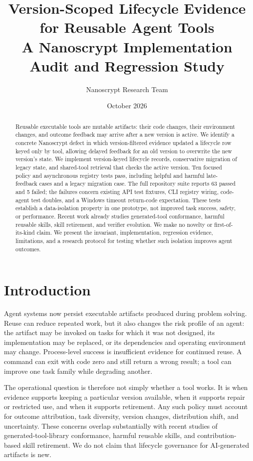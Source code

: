 \documentclass[11pt]{article}
\title{Version-Scoped Lifecycle Evidence for Reusable Agent Tools\\\large A Nanoscrypt Implementation Audit and Regression Study}
\author{Nanoscrypt Research Team}
\date{October 2026}
\begin{document}
\maketitle

\begin{abstract}
Reusable executable tools are mutable artifacts: their code changes, their environment changes, and outcome feedback may arrive after a new version is active. We identify a concrete Nanoscrypt defect in which version-filtered evidence updated a lifecycle row keyed only by tool, allowing delayed feedback for an old version to overwrite the new version's state. We implement version-keyed lifecycle records, conservative migration of legacy state, and shared-tool retrieval that checks the active version. Ten focused policy and asynchronous registry tests pass, including helpful and harmful late-feedback cases and a legacy migration case. The full repository suite reports 63 passed and 5 failed; the failures concern existing API test fixtures, CLI registry wiring, code-agent test doubles, and a Windows timeout return-code expectation. These tests establish a data-isolation property in one prototype, not improved task success, safety, or performance. Recent work already studies generated-tool conformance, harmful reusable skills, skill retirement, and verifier evolution. We make no novelty or first-of-its-kind claim. We present the invariant, implementation, regression evidence, limitations, and a research protocol for testing whether such isolation improves agent outcomes.
\end{abstract}

\section{Introduction}
Agent systems now persist executable artifacts produced during problem solving. Reuse can reduce repeated work, but it also changes the risk profile of an agent: the artifact may be invoked on tasks for which it was not designed, its implementation may be replaced, or its dependencies and operating environment may change. Process-level success is insufficient evidence for continued reuse. A command can exit with code zero and still return a wrong result; a tool can improve one task family while degrading another.

The operational question is therefore not simply whether a tool works. It is when evidence supports keeping a particular version available, when it supports repair or restricted use, and when it supports retirement. Any such policy must account for outcome attribution, task diversity, version changes, distribution shift, and uncertainty. These concerns overlap substantially with recent studies of generated-tool-library conformance, harmful reusable skills, and contribution-based skill retirement. We do not claim that lifecycle governance for AI-generated artifacts is new.
\end{document}
